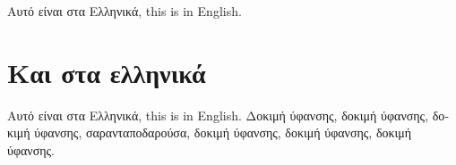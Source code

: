 \documentclass{article}
\begin{document}
Αυτό είναι στα Ελληνικά, this is in English.

\section{Και στα ελληνικά}
\begin{greek} %
Αυτό είναι στα Ελληνικά, this is in English.
Δοκιμή ύφανσης, δοκιμή ύφανσης, δοκιμή ύφανσης, σαρανταποδαρούσα,
δοκιμή ύφανσης, δοκιμή ύφανσης, δοκιμή ύφανσης.
\end{greek}
\end{document}
